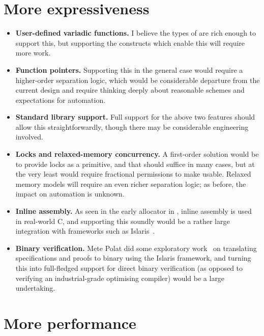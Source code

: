 \section{More expressiveness}

\begin{itemize}
    \item \textbf{User-defined variadic functions.} I believe the types of
         are rich enough to support this, but supporting the
         constructs which enable this will require more work.
    \item \textbf{Function pointers.} Supporting this in the general
        case would require a higher-order separation logic, which would
        be considerable departure from the current design and require
        thinking deeply about reasonable schemes and expectations for
        automation.
    \item \textbf{Standard library support.} Full support for the above
        two features should allow this straightforwardly, though
        there may be considerable engineering involved.
    \item \textbf{Locks and relaxed-memory concurrency.} A first-order solution
        would be to provide locks as a primitive, and that should suffice in
        many cases, but at the very least would require fractional permissions
        to make usable. Relaxed memory models will require an even richer
        separation logic; as before, the impact on automation is unknown.
    \item \textbf{Inline assembly.} As seen in the early allocator in
        , inline assembly is used in real-world C, and supporting
        this soundly would be a rather large integration with frameworks
        such as Islaris~.
    \item \textbf{Binary verification.} Mete Polat did some exploratory
        work~ on translating 
        specifications and proofs to binary using the
        Islaris framework, and turning this into full-fledged support
        for direct binary verification (as opposed to verifying an
        industrial-grade optimising compiler) would be a large undertaking.
\end{itemize}

\section{More performance}

